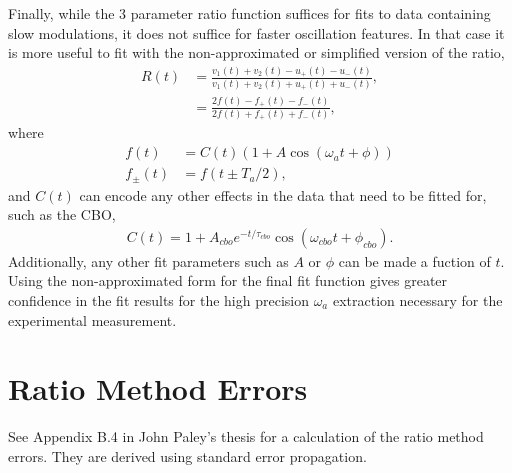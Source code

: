 Finally, while the 3 parameter ratio function suffices for fits to data containing slow modulations, it does not suffice for faster oscillation features. In that case it is more useful to fit with the non-approximated or simplified version of the ratio,
	\begin{equation}	
	\begin{aligned}
		R(t) &= \frac{v_{1}(t) + v_{2}(t) - u_{+}(t) - u_{-}(t)}{v_{1}(t) + v_{2}(t) + u_{+}(t) + u_{-}(t)}, \\ 
			 &= \frac{2f(t) - f_{+}(t) - f_{-}(t)}{2f(t) + f_{+}(t) + f_{-}(t)},
	\end{aligned}
	\end{equation}
where
	\begin{equation}	
	\begin{aligned}
		f(t) &= C(t) (1 + A \cos(\omega_{a}t + \phi)) \\ 
		f_{\pm}(t) &= f(t \pm T_{a}/2),
	\end{aligned}
	\end{equation}
and $C(t)$ can encode any other effects in the data that need to be fitted for, such as the CBO,
	\begin{align}
		C(t) = 1 + A_{cbo} e^{-t/\tau_{cbo}} \cos(\omega_{cbo}t + \phi_{cbo}).
	\end{align}
Additionally, any other fit parameters such as $A$ or $\phi$ can be made a fuction of $t$. Using the non-approximated form for the final fit function gives greater confidence in the fit results for the high precision $\omega_{a}$ extraction necessary for the experimental measurement.


\chapter{Ratio Method Errors}

See Appendix B.4 in John Paley's thesis \cite{JPThesis} for a calculation of the ratio method errors. They are derived using standard error propagation.


